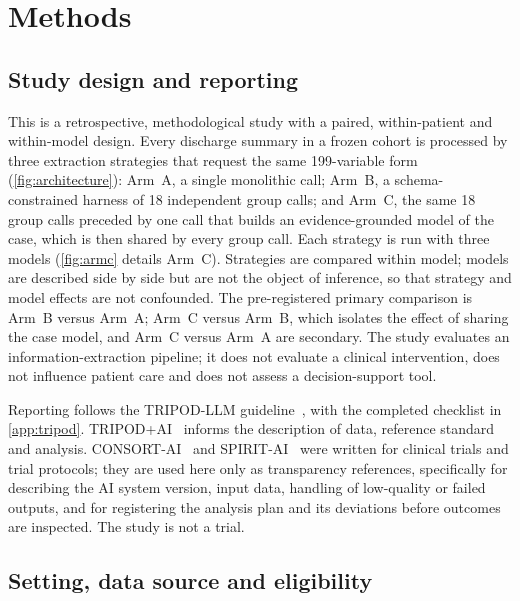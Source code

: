 \section{Methods}\label{sec:methods}

\subsection{Study design and reporting}

This is a retrospective, methodological study with a paired, within-patient and within-model
design. Every discharge summary in a frozen cohort is processed by three extraction strategies that
request the same 199-variable form (\cref{fig:architecture}): Arm~A, a single monolithic call; Arm~B, a
schema-constrained harness of 18 independent group calls; and Arm~C, the same 18 group calls preceded
by one call that builds an evidence-grounded model of the case, which is then shared by every group call.
Each strategy is run with three models (\cref{fig:armc} details Arm~C). Strategies are compared within model; models are described side
by side but are not the object of inference, so that strategy and model effects are not confounded.
The pre-registered primary comparison is Arm~B versus Arm~A; Arm~C versus Arm~B, which isolates the
effect of sharing the case model, and Arm~C versus Arm~A are secondary. The study evaluates an
information-extraction pipeline; it does not evaluate a clinical intervention, does not influence
patient care and does not assess a decision-support tool.

Reporting follows the TRIPOD-LLM guideline~\cite{gallifant2025tripodllm}, with the completed checklist
in \ref{app:tripod}. TRIPOD+AI~\cite{collins2024tripodai} informs the description of data,
reference standard and analysis. CONSORT-AI~\cite{liu2020consortai} and
SPIRIT-AI~\cite{rivera2020spiritai} were written for clinical trials and trial protocols; they are used
here only as transparency references, specifically for describing the AI system version, input data,
handling of low-quality or failed outputs, and for registering the analysis plan and its deviations
before outcomes are inspected. The study is not a trial.

\subsection{Setting, data source and eligibility}\label{sec:setting}

